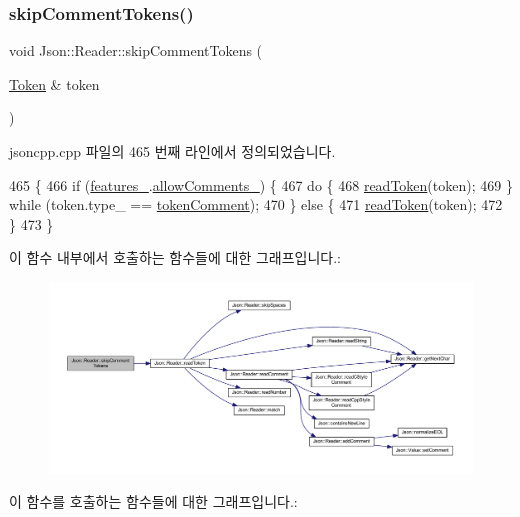 \subsubsection{\texorpdfstring{skip\+Comment\+Tokens()}{skipCommentTokens()}}
{\footnotesize\ttfamily void Json\+::\+Reader\+::skip\+Comment\+Tokens (\begin{DoxyParamCaption}\item[{\hyperlink{class_json_1_1_reader_1_1_token}{Token} \&}]{token }\end{DoxyParamCaption})\hspace{0.3cm}{\ttfamily [private]}}



jsoncpp.\+cpp 파일의 465 번째 라인에서 정의되었습니다.


\begin{DoxyCode}
465                                            \{
466   \textcolor{keywordflow}{if} (\hyperlink{class_json_1_1_reader_aa9984ff8f519b5541346157b7aebf97b}{features\_}.\hyperlink{class_json_1_1_features_a33afd389719624b6bdb23950b3c346c9}{allowComments\_}) \{
467     \textcolor{keywordflow}{do} \{
468       \hyperlink{class_json_1_1_reader_a7cb0631963cc0fd4ff6ed0f570976864}{readToken}(token);
469     \} \textcolor{keywordflow}{while} (token.type\_ == \hyperlink{class_json_1_1_reader_aa35e6ab574dc399a0a645ad98ed66bc9ae4fcf05c3b1ce462bacd34af0ccac32b}{tokenComment});
470   \} \textcolor{keywordflow}{else} \{
471     \hyperlink{class_json_1_1_reader_a7cb0631963cc0fd4ff6ed0f570976864}{readToken}(token);
472   \}
473 \}
\end{DoxyCode}
이 함수 내부에서 호출하는 함수들에 대한 그래프입니다.\+:\nopagebreak
\begin{figure}[H]
\begin{center}
\leavevmode
\includegraphics[width=350pt]{class_json_1_1_reader_a22e677ef400d8223f27e631b4cd4b821_cgraph}
\end{center}
\end{figure}
이 함수를 호출하는 함수들에 대한 그래프입니다.\+:\nopagebreak
